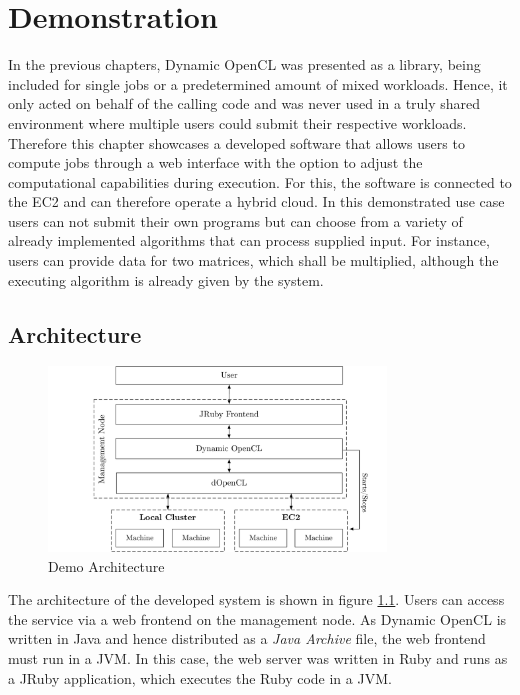 \chapter{Demonstration}
\label{demonstration}
In the previous chapters, Dynamic OpenCL was presented as a library, being included for single jobs or a predetermined amount of mixed workloads. Hence, it only acted on behalf of the calling code and was never used in a truly shared environment where multiple users could submit their respective workloads. Therefore this chapter showcases a developed software that allows users to compute jobs through a web interface with the option to adjust the computational capabilities during execution. For this, the software is connected to the EC2 and can therefore operate a hybrid cloud. In this demonstrated use case users can not submit their own programs but can choose from a variety of already implemented algorithms that can process supplied input. For instance, users can provide data for two matrices, which shall be multiplied, although the executing algorithm is already given by the system.

\section{Architecture}

\begin{figure}[!htb]
	\includegraphics[width=0.8\textwidth]{drawings/demo_architecture.pdf}
	\centering
	\caption{Demo Architecture}
	\label{img:demo_architecture}
\end{figure}
The architecture of the developed system is shown in figure \ref{img:demo_architecture}. Users can access the service via a web frontend on the management node. As Dynamic OpenCL is written in Java and hence distributed as a \textit{Java Archive} file, the web frontend must run in a JVM. In this case, the web server was written in Ruby and runs as a JRuby application, which executes the Ruby code in a JVM.

